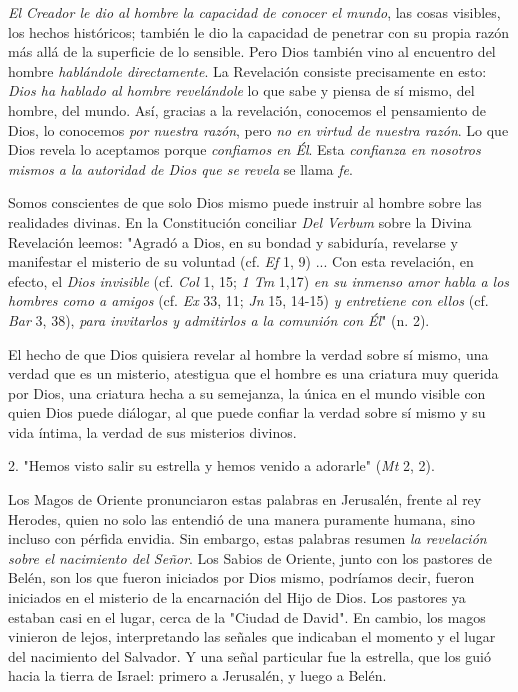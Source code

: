 \emph{El Creador le dio al hombre la capacidad de conocer el mundo}, las
cosas visibles, los hechos históricos; también le dio la capacidad de
penetrar con su propia razón más allá de la superficie de lo sensible.
Pero Dios también vino al encuentro del hombre \emph{hablándole
	directamente}. La Revelación consiste precisamente en esto: \emph{Dios
	ha hablado al hombre revelándole} lo que sabe y piensa de sí mismo, del
hombre, del mundo. Así, gracias a la revelación, conocemos el
pensamiento de Dios, lo conocemos \emph{por nuestra razón}, pero
\emph{no en virtud de nuestra razón}. Lo que Dios revela lo aceptamos
porque \emph{confiamos en Él}. Esta \emph{confianza en nosotros mismos a
	la autoridad de Dios que se revela} se llama \emph{fe}.

Somos conscientes de que solo Dios mismo puede instruir al hombre sobre
las realidades divinas. En la Constitución conciliar \emph{Del Verbum}
sobre la Divina Revelación leemos: "Agradó a Dios, en su bondad y
sabiduría, revelarse y manifestar el misterio de su voluntad (cf.
\emph{Ef} 1, 9) ... Con esta revelación, en efecto, el \emph{Dios
	invisible} (cf. \emph{Col} 1, 15; \emph{1 Tm} 1,17) \emph{en su inmenso
	amor habla a los hombres como a amigos} (cf. \emph{Ex} 33, 11; \emph{Jn}
15, 14-15) \emph{y entretiene con ellos} (cf. \emph{Bar} 3, 38),
\emph{para invitarlos y admitirlos a la comunión con Él}" (n. 2).

El hecho de que Dios quisiera revelar al hombre la verdad sobre sí
mismo, una verdad que es un misterio, atestigua que el hombre es una
criatura muy querida por Dios, una criatura hecha a su semejanza, la
única en el mundo visible con quien Dios puede diálogar, al que puede
confiar la verdad sobre sí mismo y su vida íntima, la verdad de sus
misterios divinos.

2. "Hemos visto salir su estrella y hemos venido a adorarle" (\emph{Mt}
2, 2).

Los Magos de Oriente pronunciaron estas palabras en Jerusalén, frente al
rey Herodes, quien no solo las entendió de una manera puramente humana,
sino incluso con pérfida envidia. Sin embargo, estas palabras resumen
\emph{la revelación sobre el nacimiento del Señor}. Los Sabios de
Oriente, junto con los pastores de Belén, son los que fueron iniciados
por Dios mismo, podríamos decir, fueron iniciados en el misterio de la
encarnación del Hijo de Dios. Los pastores ya estaban casi en el lugar,
cerca de la "Ciudad de David". En cambio, los magos vinieron de lejos,
interpretando las señales que indicaban el momento y el lugar del
nacimiento del Salvador. Y una señal particular fue la estrella, que los
guió hacia la tierra de Israel: primero a Jerusalén, y luego a Belén.

